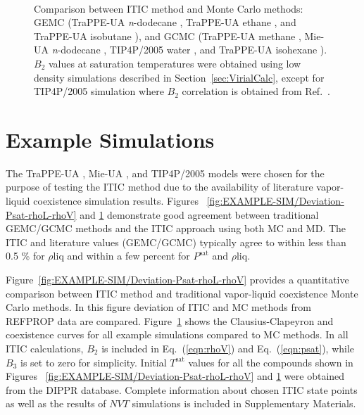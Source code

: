 \documentclass[5p,times]{elsarticle}
\begin{document}
\begin{figure}[]
\centering
{}\label{aa}
\label{bb}\\
\label{cc}
\label{dd}
\caption{
Comparison between ITIC method and Monte Carlo methods: GEMC (TraPPE-UA \textit{n}-dodecane \cite{Martin1998}, TraPPE-UA ethane \cite{Martin1998}, and TraPPE-UA isobutane \cite{Wick2000}), and GCMC (TraPPE-UA methane \cite{Shen2008}, Mie-UA \textit{n}-dodecane \cite{Potoff2009}, TIP4P/2005 water \cite{Shen2008}, and TraPPE-UA isohexane \cite{Mick2017}). $B_2$ values at saturation temperatures were obtained using low density simulations described in Section~\ref{sec:VirialCalc}, except for TIP4P/2005 simulation where $B_2$ correlation is obtained from Ref.~\cite{Benjamin2007,Chialvo2006}.
}
\label{fig:EXAMPLE-SIM/all}
\end{figure}

\section{Example Simulations} \label{sec:ExampleSim}
The TraPPE-UA \cite{Martin1998,Martin1999,Wick2000}, Mie-UA \cite{Potoff2009,Mick2017,Barhaghi2017,Mick2015}, and TIP4P/2005 \cite{Abascal2005} models were chosen for the purpose of testing the ITIC method due to the availability of literature vapor-liquid coexistence simulation results. Figures ~\ref{fig:EXAMPLE-SIM/Deviation-Psat-rhoL-rhoV} and \ref{fig:EXAMPLE-SIM/all} demonstrate good agreement between traditional GEMC/GCMC methods and the ITIC approach using both MC and MD. The ITIC and literature values (GEMC/GCMC) typically agree to within less than 0.5 \% for $\rho\mathrm{liq}$ and within a few percent for $P^\mathrm{sat}$ and $\rho\mathrm{liq}$.

Figure~\ref{fig:EXAMPLE-SIM/Deviation-Psat-rhoL-rhoV} provides a quantitative comparison between ITIC method and traditional vapor-liquid coexistence Monte Carlo methods. In this figure deviation of ITIC and MC methods from REFPROP data are compared. Figure~\ref{fig:EXAMPLE-SIM/all} shows the Clausius-Clapeyron and coexistence curves for all example simulations compared to MC methods. In all ITIC calculations, $B_2$ is included in Eq.~(\ref{eqn:rhoV}) and Eq.~(\ref{eqn:psat}), while $B_3$ is set to zero for simplicity. Initial $T^\mathrm{sat}$ values for all the compounds shown in Figures ~\ref{fig:EXAMPLE-SIM/Deviation-Psat-rhoL-rhoV} and \ref{fig:EXAMPLE-SIM/all} were obtained from the DIPPR \cite{DIPPR2004} database. Complete information about chosen ITIC state points as well as the results of $NVT$ simulations is included in Supplementary Materials.
\end{document}

